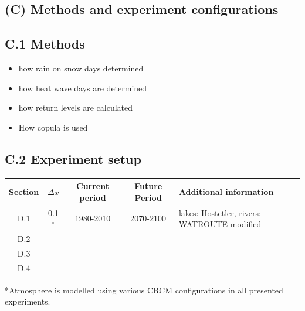 \documentclass[a0,landscape]{a0poster}
\begin{document}
\begin{multicols*}{4}

\section*{(C) Methods and experiment configurations}
\subsection*{C.1 Methods}
%
\begin{itemize}
  \item how rain on snow days determined
  \item how heat wave days are determined
  \item how return levels are calculated
  \item How copula is used
\end{itemize}

\subsection*{C.2 Experiment setup}

\begin{tcolorbox}[colback=white,colframe=green!40!black]
\center
\begin{tabular}{c|c|c|c|l}
    Section & $\Delta x$ & Current period & Future Period & Additional information \\
    \hline\hline
    D.1    & 0.1$^\circ$ & 1980-2010      & 2070-2100     & \begin{minipage}{8cm}\flushleft lakes: Hostetler, rivers: WATROUTE-modified \end{minipage}\\
    D.2    &             & \\
    D.3    &             &\\
    D.4    &             &\\
    \hline
\end{tabular}

\vspace{2cm}
\begin{minipage}{\linewidth}
 *Atmosphere is modelled using various CRCM configurations in all presented experiments.
\end{minipage}
\end{tcolorbox}


\end{multicols*}
\end{document}
